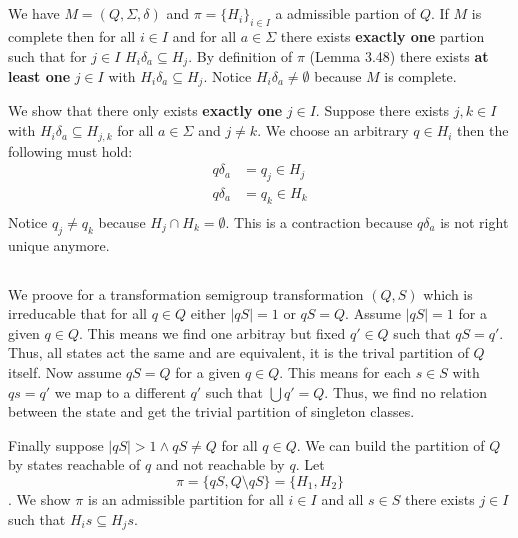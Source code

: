 \documentclass[a4paper,12pt,numbers=noenddot]{scrreport}
\begin{document}

\setcounter{chapter}{4}
\chapter{}
\section{}
We have $M = (Q, \Sigma, \delta)$ and $\pi = \{H_i\}_{i \in I}$ a admissible partion of $Q$.
If $M$ is complete then for all $i \in I$ and for all $a \in \Sigma$ there exists \textbf{exactly one} partion such that for $j \in I$ $H_i\delta_a \subseteq H_j$.
By definition of $\pi$ (Lemma 3.48) there exists \textbf{at least one} $j \in I$ with $H_i\delta_a \subseteq H_j$.
Notice $H_i\delta_a \neq \emptyset$ because $M$ is complete.

We show that there only exists \textbf{exactly one} $j \in I$.
Suppose there exists $j,k \in I$ with $H_i\delta_a \subseteq H_{j,k}$ for all $a \in \Sigma$ and $j \neq k$.
We choose an arbitrary $q \in H_i$ then the following must hold:
\begin{align*}
    q\delta_a &= q_j \in H_j \\
    q\delta_a &= q_k \in H_k \\
\end{align*}
Notice $q_j \neq q_k$ because $H_j \cap H_k = \emptyset$.
This is a contraction because $q\delta_a$ is not right unique anymore.

\section{}
We proove for a transformation semigroup transformation $(Q,S)$ which is irreducable that for all $q \in Q$ either $|qS| = 1$  or $qS = Q$.
Assume $|qS| = 1$ for a given $q \in Q$. This means we find one arbitray but fixed $q' \in Q$ such that $qS = q'$.
Thus, all states act the same and are equivalent, it is the trival partition of $Q$ itself.
Now assume $qS = Q$ for a given $q \in Q$. This means for each $s \in S$ with $qs = q'$ we map to a different $q'$ such that $\bigcup q' = Q$.
Thus, we find no relation between the state and get the trivial partition of singleton classes.

Finally suppose $|qS| > 1 \land qS \neq Q$ for all $q \in Q$.
We can build the partition of $Q$ by states reachable of $q$ and not reachable by $q$.
Let $$\pi = \{qS, Q \setminus qS\} = \{H_1, H_2\}$$.
We show $\pi$ is an admissible partition for all $i \in I$ and all $s \in S$ there exists $j \in I$ such that $H_is \subseteq H_js$.
\end{document}

